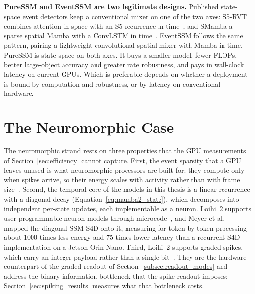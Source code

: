 \documentclass[11pt, a4paper]{report}
\begin{document}
\textbf{PureSSM and EventSSM are two legitimate designs.} Published state-space event detectors keep a
conventional mixer on one of the two axes: S5-RVT combines attention in space with an S5 recurrence in
time~\cite{zubic2024state}, and SMamba a sparse spatial Mamba with a ConvLSTM in time~\cite{yang2025smamba}.
EventSSM follows the same pattern, pairing a lightweight convolutional spatial mixer with Mamba in time.
PureSSM is state-space on both axes. It buys a smaller model, fewer FLOPs, better large-object accuracy
and greater rate robustness, and pays in wall-clock latency on current GPUs. Which is preferable depends
on whether a deployment is bound by computation and robustness, or by latency on conventional hardware.

\section{The Neuromorphic Case}
\label{sec:neuro_case}
The neuromorphic strand rests on three properties that the GPU measurements of
Section~\ref{sec:efficiency} cannot capture. First, the event sparsity that a GPU leaves unused is what
neuromorphic processors are built for: they compute only when spikes arrive, so their energy scales with
activity rather than with frame size~\cite{davies2021advancing}. Second, the temporal core of the models
in this thesis is a linear recurrence with a diagonal decay (Equation~\eqref{eq:mamba2_state}), which
decomposes into independent per-state updates, each implementable as a neuron. Loihi~2 supports
user-programmable neuron models through microcode~\cite{orchard2021efficient}, and Meyer
et al.~\cite{meyer2024diagonal} mapped the diagonal SSM S4D onto it, measuring for token-by-token
processing about 1000 times less energy and 75 times lower latency than a recurrent S4D implementation on
a Jetson Orin Nano. Third, Loihi~2 supports graded spikes, which carry an integer payload rather than a
single bit~\cite{orchard2021efficient}. They are the hardware counterpart of the graded readout of
Section~\ref{subsec:readout_modes} and address the binary information bottleneck that the spike readout
imposes; Section~\ref{sec:spiking_results} measures what that bottleneck costs.
\end{document}
